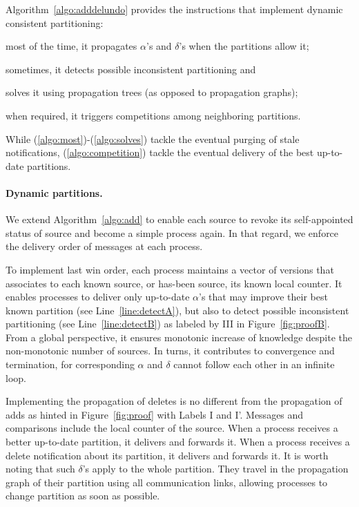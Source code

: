 Algorithm~\ref{algo:adddelundo} provides the instructions that
implement dynamic consistent partitioning:
\begin{inparaenum}[(i)]
\item \label{algo:most} most of the time, it propagates $\alpha$'s and
  $\delta$'s when the partitions allow it;
\item \label{algo:sometimes} sometimes, it detects possible
  inconsistent partitioning and
\item \label{algo:solves}solves it using propagation trees (as opposed
  to propagation graphs);
\item \label{algo:competition} when required, it triggers competitions
  among neighboring partitions.
\end{inparaenum}
While (\ref{algo:most})-(\ref{algo:solves}) tackle the eventual purging of
stale notifications, (\ref{algo:competition}) tackle the eventual
delivery of the best up-to-date partitions.

\paragraph{Dynamic partitions.}
We extend Algorithm~\ref{algo:add} to enable each source to revoke its
self-appointed status of source and become a simple process again. In
that regard, we enforce the delivery order of messages at each
process.

To implement last win order, each process maintains a vector of
versions that associates to each known source, or has-been source, its
known local counter. It enables processes to deliver only up-to-date
$\alpha$'s that may improve their best known partition (see
Line~\ref{line:detectA}), but also to detect possible inconsistent
partitioning (see Line~\ref{line:detectB}) as labeled by III in
Figure~\ref{fig:proofB}. From a global perspective, it ensures
monotonic increase of knowledge despite the non-monotonic number of
sources. In turns, it contributes to convergence and termination, for
corresponding $\alpha$ and $\delta$ cannot follow each other in an
infinite loop.

Implementing the propagation of deletes is no different from the
propagation of adds as hinted in Figure~\ref{fig:proof} with Labels I
and I'. Messages and comparisons include the local counter of the
source. When a process receives a better up-to-date partition, it
delivers and forwards it. When a process receives a delete
notification about its partition, it delivers and forwards it. It is
worth noting that such $\delta$'s apply to the whole partition. They
travel in the propagation graph of their partition using all
communication links, allowing processes to change partition as soon as
possible.


